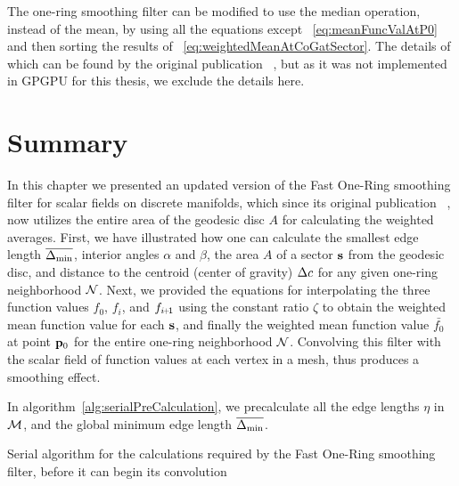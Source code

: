 The one-ring smoothing filter can be modified to use the median operation, instead of the mean, by using all the equations except ~\ref{eq:meanFuncValAtP0} and then sorting the results of ~\ref{eq:weightedMeanAtCoGatSector}. The details of which can be found by the original publication ~\cite[s.~3.2]{Mara17}, but as it was not implemented in GPGPU for this thesis, we exclude the details here.
%
\section{Summary}
\label{cFONSsS}
In this chapter we presented an updated version of the Fast One-Ring smoothing filter for scalar fields on discrete manifolds, which since its original publication ~\cite[s.~3.2]{Mara17}, now utilizes the entire area of the geodesic disc $A$ for calculating the weighted averages. First, we have illustrated how one can calculate the smallest edge length $\overline{\Delta_\text{min}}$, interior angles $\alpha$ and $\beta$, the area $A$ of a sector $\mathbf{s}$ from the geodesic disc, and distance to the centroid (center of gravity) $\Delta c$ for any given one-ring neighborhood $\mathcal{N}$. Next, we provided the equations for interpolating the three function values $f_0$, $f_i$, and $f_{\sipo}$ using the constant ratio $\zeta$ to obtain the weighted mean function value for each $\mathbf{s}$, and finally the weighted mean function value $\bar{f_0}$ at point ${\mathbf{p}_0}$ for the entire one-ring neighborhood $\mathcal{N}$. Convolving this filter with the scalar field of function values at each vertex in a mesh, thus produces a smoothing effect.

In algorithm~\ref{alg:serialPreCalculation}, we precalculate all the edge lengths $\eta$ in $\mathcal{M}$, and the global minimum edge length $\overline{\Delta_\text{min}}$.
\begin{algorithm}
	\DontPrintSemicolon


	\bigskip
	\;
\nl	{}
	\caption{Serial algorithm for the calculations required by the Fast One-Ring smoothing filter, before it can begin its convolution \label{alg:serialPreCalculation}}
\end{algorithm}%
%
%

